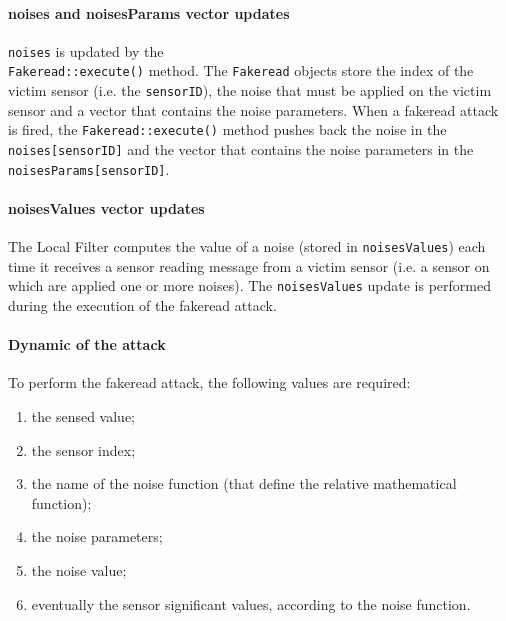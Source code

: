 \paragraph{noises and noisesParams vector updates}
\texttt{noises} is updated by the\\ \texttt{Fakeread::execute()} method. The \texttt{Fakeread} objects store the index of the victim sensor (i.e. the \texttt{sensorID}), the noise that must be applied on the victim sensor and a vector that contains the noise parameters. When a fakeread attack is fired, the \texttt{Fakeread::execute()} method pushes back the noise in the \texttt{noises[sensorID]} and the vector that contains the noise parameters in the \texttt{noisesParams[sensorID]}.

\paragraph{noisesValues vector updates}
The Local Filter computes the value of a noise (stored in \texttt{noisesValues}) each time it receives a sensor reading message from a victim sensor (i.e. a sensor on which are applied one or more noises). The \texttt{noisesValues} update is performed during the execution of the fakeread attack.


\paragraph{Dynamic of the attack}
To perform the fakeread attack, the following values are required:
%
\begin{enumerate}
\item the sensed value;
\item the sensor index;
\item the name of the noise function (that define the relative mathematical function);
\item the noise parameters;
\item the noise value;
\item eventually the sensor significant values, according to the noise function.
\end{enumerate}

